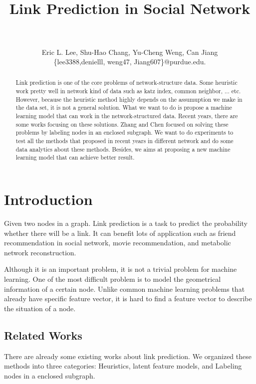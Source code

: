 \documentclass[paper=letter, fontsize=12pt]{scrartcl} %
\title{	
\normalfont \normalsize 
\horrule{2pt} \\[0.4cm] %
{\LARGE Link Prediction in Social Network} \\ %
\horrule{1pt} \\[0.5cm] %
}
\author{\large{Eric L. Lee, Shu-Hao Chang, Yu-Cheng Weng, Can Jiang}\\
  \normalsize{\{lee3388,denielll, weng47, Jiang607\}@purdue.edu.}
} %
\date{} %
\begin{document}
\maketitle %

\begin{abstract}
  Link prediction is one of the core problems of network-structure data. Some heuristic work pretty well in network kind of data such as katz index\cite{katz}, common neighbor, ... etc. However, because the heuristic method highly depends on the assumuption we make in the data set, it is not a general solution. What we want to do is propose a machine learning model that can work in the network-structured data. Recent years, there are some works focusing on these solutions. Zhang and Chen \cite{lpnn} \cite{wlnn} focused on solving these problems by labeling nodes in an enclosed subgraph. We want to do experiments to test all the methods that proposed in recent years in different network and do some data analytics about these methods. Besides, we aims at proposing a new machine learning model that can achieve better result.
\end{abstract}

\section{Introduction}
Given two nodes in a graph. Link prediction is a task to predict the probability whether there will be a link. It can benefit lots of application such as friend recommendation in social network, movie recommendation, and metabolic network reconstruction.

Although it is an important problem, it is not a trivial problem for machine learning. One of the most difficult problem is to model the geometrical information of a certain node. Unlike common machine learning problems that already have specific feature vector, it is hard to find a feature vector to describe the situation of a node.

\subsection {Related Works}
There are already some existing works about link prediction. We organized these methods into three categories: Heuristics, latent feature models, and  Labeling nodes in a enclosed subgraph.
\end{document}

